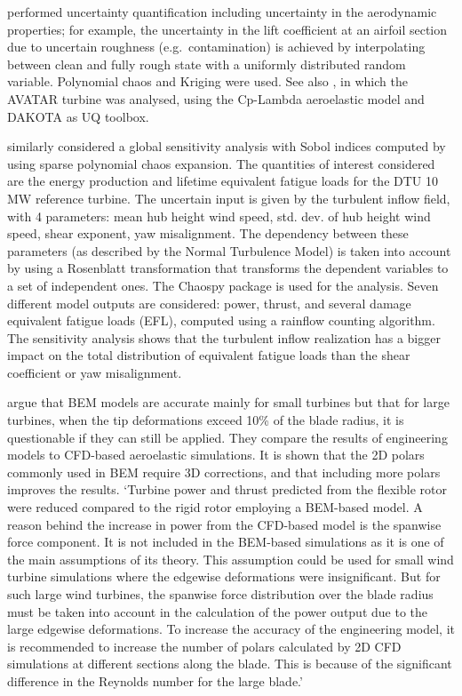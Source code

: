 \cite{Matthaus2017} performed uncertainty quantification including uncertainty in the aerodynamic properties; for example, the uncertainty in the lift coefficient at an airfoil section due to uncertain roughness (e.g.\ contamination) is achieved by interpolating between clean and fully rough state with a uniformly distributed random variable. Polynomial chaos and Kriging were used. See also \cite{Bortolotti2019}, in which the AVATAR turbine was analysed, using the Cp-Lambda aeroelastic model and DAKOTA as UQ toolbox. 

\cite{Murcia2018} similarly considered a global sensitivity analysis with Sobol indices computed by using sparse polynomial chaos expansion. The quantities of interest considered are the energy production and lifetime equivalent fatigue loads for the DTU 10 MW reference turbine. The uncertain input is given by the turbulent inflow field, with 4 parameters: mean hub height wind speed, std. dev. of hub height wind speed, shear exponent, yaw misalignment. The dependency between these parameters (as described by the Normal Turbulence Model) is taken into account by using a Rosenblatt transformation that transforms the dependent variables to a set of independent ones. The Chaospy package is used for the analysis. Seven different model outputs are considered: power, thrust, and several damage equivalent fatigue loads (EFL), computed using a rainflow counting algorithm. The sensitivity analysis shows that the turbulent inflow realization has a bigger impact on the total distribution of equivalent fatigue loads than the shear coefficient or yaw misalignment.

\cite{Sayed2019} argue that BEM models are accurate mainly for small turbines but that for large turbines, when the tip deformations exceed 10\% of the blade radius, it is questionable if they can still be applied. They compare the results of engineering models to CFD-based aeroelastic simulations. It is shown that the 2D polars commonly used in BEM require 3D corrections, and that including more polars improves the results. `Turbine power and thrust predicted from the flexible rotor were reduced compared to the rigid rotor employing a BEM-based model. A reason behind the increase in power from the CFD-based model is the spanwise force component. It is not included in the BEM-based simulations as it is one of the main assumptions of its theory. This assumption could be used for small wind turbine simulations where the edgewise deformations were insignificant. But for such large wind turbines, the spanwise force distribution over the blade radius must be taken into account in the calculation of the power output due to the large edgewise deformations. To increase the accuracy of the engineering model, it is recommended to increase the number of polars calculated by 2D CFD simulations at different sections along the blade. This is because of the significant difference in the Reynolds number for the large blade.'

